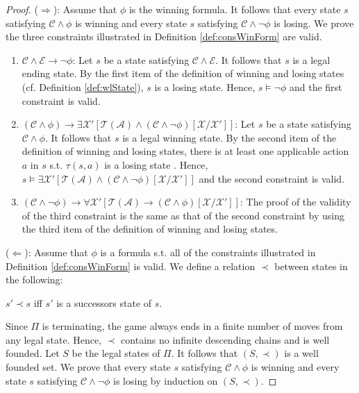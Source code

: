 \documentclass[review]{elsarticle}
\newcommand{\statevar}{\mathcal{X}}
\newcommand{\act}{\mathcal{A}}
\newcommand{\trans}{\mathcal{T}}
\newcommand{\constraint}{\mathcal{C}}
\newcommand{\estate}{\mathcal{E}}
\newcommand{\wfOrder}{\prec}
\begin{document}
	\begin{proof}
		($\Rightarrow$): Assume that $\phi$ is the winning formula.
		It follows that every state $s$ satisfying $\constraint \land \phi$ is winning and every state $s$ satisfying $\constraint \land \neg \phi$ is losing.	
		We prove the three constraints illustrated in Definition \ref{def:consWinForm} are valid.
		\begin{enumerate}
			\item $\constraint \land \estate \rightarrow \neg \phi$: 
			Let $s$ be a state satisfying $\constraint \land \estate$.
			It follows that $s$ is a legal ending state.
			By the first item of the definition of winning and losing states (cf. Definition \ref{def:wlState}), $s$ is a losing state.
			Hence, $s \models \neg \phi$ and the first constraint is valid.
				
			\item $(\constraint \land \phi) \rightarrow \exists \statevar' [\trans(\act) \land (\constraint \land \neg \phi)[\statevar/\statevar']]$: 
			Let $s$ be a state satisfying $\constraint \land \phi$.
			It follows that $s$ is a legal winning state.
			By the second item of the definition of winning and losing states, there is at least one applicable action $a$ in $s$ s.t. $\tau(s, a)$ is a losing state .
			Hence, $s \models \exists \statevar' [\trans(\act) \land (\constraint \land \neg \phi)[\statevar/\statevar']]$ and the second constraint is valid.
			
			\item $(\constraint \land \neg \phi) \rightarrow \forall \statevar' [\trans(\act) \rightarrow (\constraint \land \phi)[\statevar/\statevar']]$:
			The proof of the validity of the third constraint is the same as that of the second constraint by using the third item of the definition of winning and losing states.
		\end{enumerate}
				
		($\Leftarrow$): Assume that $\phi$ is a formula s.t. all of the constraints illustrated in Definition \ref{def:consWinForm} is valid.
		We define a relation $\wfOrder$ between states in the following:
		\begin{center}
			$s' \wfOrder s$ iff $s'$ is a successors state of $s$.
		\end{center}
		Since $\Pi$ is terminating, the game always ends in	a finite number of moves from any legal state.
		Hence, $\wfOrder$ contains no infinite descending chains and is well founded.
		Let $S$ be the legal states of $\Pi$.
		It follows that $(S, \wfOrder)$ is a well founded set.
		We prove that every state $s$ satisfying $\constraint \land \phi$ is winning and every state $s$ satisfying $\constraint \land \neg \phi$ is losing by induction on $(S, \wfOrder)$.
		

\end{proof}
\end{document}
